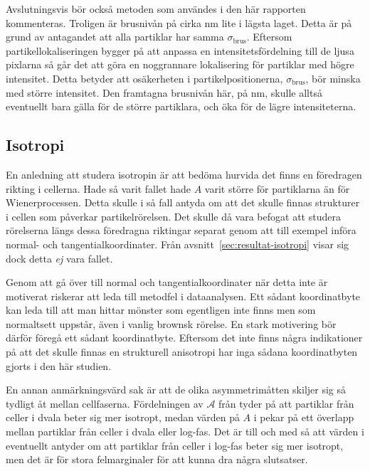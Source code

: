 Avslutningsvis bör också metoden som användes i den här rapporten kommenteras. Troligen är brusnivån på cirka \unit[5]{nm} lite i lägsta laget. Detta är på grund av antagandet att alla partiklar har samma $\sigma_\text{brus}$. Eftersom partikellokaliseringen bygger på att anpassa en intensitetsfördelning till de ljusa pixlarna så går det att göra en noggrannare lokalisering för  partiklar med högre intensitet. Detta betyder att osäkerheten i partikelpositionerna, $\sigma_\text{brus}$, bör minska med större intensitet. Den framtagna brusnivån här, på \unit[5]{nm}, skulle alltså eventuellt bara gälla för de större partiklara, och öka för de lägre intensiteterna.




\subsection{Isotropi}

En anledning att studera isotropin är att bedöma hurvida det finns en föredragen rikting i cellerna. Hade så varit fallet hade $A$ varit större för partiklarna än för Wienerprocessen. Detta skulle i så fall antyda om att det skulle finnas strukturer i cellen som påverkar partikelrörelsen. Det skulle då vara befogat att studera rörelserna längs dessa föredragna riktingar separat genom att till exempel införa normal- och tangentialkoordinater. Från avsnitt~\ref{sec:resultat-isotropi} visar sig dock detta \emph{ej} vara fallet.

Genom att gå över till normal och tangentialkoordinater när detta inte är motiverat riskerar att leda till metodfel i dataanalysen. Ett sådant koordinatbyte kan leda till att man hittar mönster som egentligen inte finns men som normaltsett uppstår, även i vanlig brownsk rörelse. En stark motivering bör därför föregå ett sådant koordinatbyte. Eftersom det inte finns några indikationer på att det skulle finnas en strukturell anisotropi har inga sådana koordinatbyten gjorts i den här studien.


En annan anmärkningsvärd sak är att de olika asymmetrimåtten skiljer sig så tydligt åt mellan cellfaserna. Fördelningen av $\mathcal{A}$ från  tyder på att partiklar från celler i dvala beter sig mer isotropt, medan värden på $A$ i  pekar på ett överlapp mellan partiklar från celler i dvala eller log-fas. Det är till och med så att värden i  eventuellt antyder om att partiklar från celler i log-fas beter sig mer isotropt, men det är för stora felmarginaler för att kunna dra några slutsatser.

